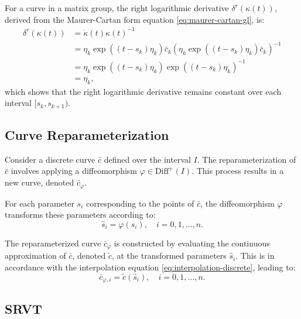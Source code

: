 For a curve in a matrix group, the right logarithmic derivative \(\delta^r(\kappa(t))\), derived from the Maurer-Cartan form equation \eqref{eq:maurer-cartan-gl}, is:
\begin{equation}
    \begin{split}
        \delta^r(\kappa(t)) &= \dot{\kappa}(t) \kappa(t)^{-1} \\
        &= \eta_k \exp\left((t - s_k)\eta_k\right)\bar{c}_k \left(\eta_k \exp\left((t - s_k)\eta_k\right)\bar{c}_k\right)^{-1} \\
        &= \eta_k \exp\left((t - s_k)\eta_k\right) \exp\left((t - s_k)\eta_k\right)^{-1} \\
        &= \eta_k,
    \end{split}
    \label{eq:right-log-der-disc}
\end{equation}
which shows that the right logarithmic derivative remains constant over each interval \([s_k, s_{k+1})\).

\subsection{Curve Reparameterization}
\label{subsec:curve-reparameterization}

Consider a discrete curve \(\bar{c}\) defined over the interval \(I\). The reparameterization of \(\bar{c}\) involves applying a diffeomorphism \(\varphi \in \mathrm{Diff}^{+}(I)\). This process results in a new curve, denoted \(\bar{c}_{\varphi}\).

For each parameter \(s_i\) corresponding to the points of \(\bar{c}\), the diffeomorphism \(\varphi\) transforms these parameters according to:
\begin{equation}
    \hat{s}_i = \varphi(s_i), \quad i = 0, 1, \dots, n. 
\end{equation}

The reparameterized curve \(\bar{c}_{\varphi}\) is constructed by evaluating the continuous approximation of \(\bar{c}\), denoted \(\tilde{c}\), at the transformed parameters \(\hat{s}_i\). This is in accordance with the interpolation equation \eqref{eq:interpolation-discrete}, leading to:
\begin{equation}
    \bar{c}_{\varphi, i} = \tilde{c}(\hat{s}_i), \quad i = 0, 1, \dots, n.
\end{equation}

\subsection{SRVT}
\label{subsec:srvt}

